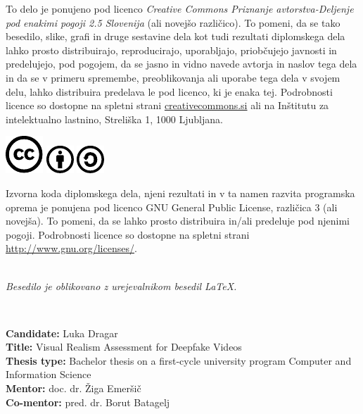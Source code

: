 \documentclass[a4paper,12pt,openright]{book}
\newcommand{\clearemptydoublepage}{\newpage{\pagestyle{empty}\cleardoublepage}}
\newcommand{\CcImageCc}[1]{%
	\includegraphics[scale=#1]{cc_cc_30.pdf}%
}
\newcommand{\CcImageBy}[1]{%
	\includegraphics[scale=#1]{cc_by_30.pdf}%
}
\newcommand{\CcImageSa}[1]{%
	\includegraphics[scale=#1]{cc_sa_30.pdf}%
}
\begin{document}
\newpage
\thispagestyle{empty}

\vspace*{5cm}
{\small \noindent
To delo je ponujeno pod licenco \textit{Creative Commons Priznanje avtorstva-Deljenje pod enakimi pogoji 2.5 Slovenija} (ali novej\v so razli\v cico).
To pomeni, da se tako besedilo, slike, grafi in druge sestavine dela kot tudi rezultati diplomskega dela lahko prosto distribuirajo,
reproducirajo, uporabljajo, priobčujejo javnosti in predelujejo, pod pogojem, da se jasno in vidno navede avtorja in naslov tega
dela in da se v primeru spremembe, preoblikovanja ali uporabe tega dela v svojem delu, lahko distribuira predelava le pod
licenco, ki je enaka tej.
Podrobnosti licence so dostopne na spletni strani \href{http://creativecommons.si}{creativecommons.si} ali na Inštitutu za
intelektualno lastnino, Streliška 1, 1000 Ljubljana.

\vspace*{1cm}
\begin{center}%
\CcImageCc{0.741573033707865}\hspace*{1ex}\CcImageBy{1}\hspace*{1ex}\CcImageSa{1}%
\end{center}
}

\vspace*{1cm}
{\small \noindent
Izvorna koda diplomskega dela, njeni rezultati in v ta namen razvita programska oprema je ponujena pod licenco GNU General Public License,
različica 3 (ali novejša). To pomeni, da se lahko prosto distribuira in/ali predeluje pod njenimi pogoji.
Podrobnosti licence so dostopne na spletni strani \url{http://www.gnu.org/licenses/}.
}

\vfill
\begin{center} 
\ \\ \vfill
{\em
Besedilo je oblikovano z urejevalnikom besedil \LaTeX.}
\end{center}

\clearemptydoublepage

\thispagestyle{empty}
\


\bigskip

\noindent\textbf{Candidate:} Luka Dragar\\
\noindent\textbf{Title:} Visual Realism Assessment for Deepfake Videos\\
\noindent\textbf{Thesis type:} Bachelor thesis on a first-cycle university program Computer
and Information Science \\
\noindent\textbf{Mentor:} doc. dr. Žiga Emeršič\\
\noindent\textbf{Co-mentor:} pred. dr. Borut Batagelj
\end{document}
